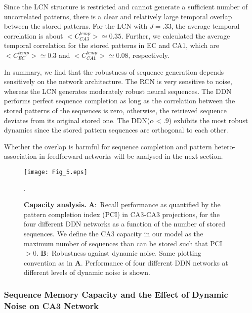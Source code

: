 \documentclass[utf8]{frontiersSCNS} %
\begin{document}
Since the LCN structure is restricted and cannot generate a sufficient number of uncorrelated patterns, there is a clear and relatively large temporal overlap between the stored patterns. For the LCN with $J = .33$, the average temporal correlation is about $<C^{temp}_{CA3}> \simeq 0.35$. 
Further, we calculated the average temporal correlation for the stored patterns in EC and CA1, which are $<C^{temp}_{EC}> \simeq 0.3$ and $<C^{temp}_{CA1}> \simeq 0.08$, respectively. 	    

In summary, we find that the robustness of sequence generation depends sensitively on the network architecture. The RCN is very sensitive to noise, whereas the LCN generates moderately robust neural sequences. The DDN performs perfect sequence completion as long as the correlation between the stored patterns of the sequences is zero, otherwise, the retrieved sequence deviates from its original stored one. The DDN($\alpha < .9$) exhibits the most robust dynamics since the stored pattern sequences are orthogonal to each other.

Whether the overlap is harmful for sequence completion and pattern hetero-association in feedforward networks will be analysed in the next section. 

\begin{figure}[!htb]
\centering\texttt{[image: Fig\_5.eps]}
\caption{\textbf{Capacity analysis.} 
\textbf{A}:~Recall performance as quantified by the pattern completion index (PCI) in CA3-CA3 projections, for the four different DDN networks as a function of the number of stored sequences. 
We define the CA3 capacity in our model as the maximum number of sequences than can be stored such that PCI $> 0$. \textbf{B}:~Robustness against dynamic noise.
Same plotting convention as in \textbf{A}.
Performance of four different DDN networks at different levels of dynamic noise is shown.
}.   
\label{Fig_5}
\end{figure}

\subsubsection{Sequence Memory Capacity and the Effect of Dynamic Noise on CA3 Network}
\end{document}
